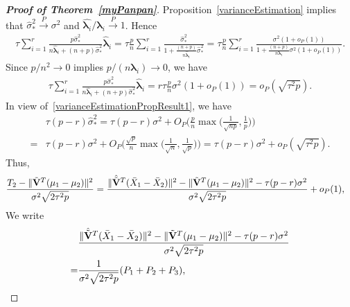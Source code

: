 \documentclass[3p]{elsarticle}
\newcommand{\bfsym}[1]{\ensuremath{\boldsymbol{#1}}}
\def\blambda {\bfsym {\lambda}}        \def\bLambda {\bfsym {\Lambda}}
\theoremstyle{plain}
\theoremstyle{definition}
\theoremstyle{remark}
\begin{document}
\begin{appendices}
\begin{proof}[\textbf{Proof of Theorem~\ref{myPanpan}}]
    Proposition~\ref{varianceEstimation} implies that $\hat{\sigma}_{*}^2\xrightarrow{P} \sigma^2$ and $\hat{\blambda_i}/\blambda_i\xrightarrow{P} 1$.
    Hence
    $$
    \begin{aligned} 
 \tau\sum_{i=1}^r \frac{p\hat{\sigma}_*^2}{n\hat{\blambda}_i+(n+p)\hat{\sigma}_*^2}\hat{\blambda}_i
        =
        \tau\frac{p}{n}\sum_{i=1}^r \frac{\hat{\sigma}_*^2}{1+\frac{(n+p)}{n\hat{\blambda}_i}\hat{\sigma}_*^2}
        =
        \tau\frac{p}{n}\sum_{i=1}^r \frac{\sigma^2(1+o_P(1))}{1+\frac{(n+p)}{n\blambda_i}\sigma^2(1+o_P(1))}.
    \end{aligned}
    $$
    Since $p/n^2\to 0$ implies $p/(n\blambda_i)\to 0$, we have
    $$
    \begin{aligned} 
 \tau\sum_{i=1}^r \frac{p\hat{\sigma}_*^2}{n\hat{\blambda}_i+(n+p)\hat{\sigma}_*^2}\hat{\blambda}_i
        =r\tau \frac{p}{n} \sigma^2(1+o_P(1))=o_P(\sqrt{\tau^2 p}).
    \end{aligned}
    $$
    In view of~\eqref{varianceEstimationPropResult1}, we have
    $$
    \begin{aligned}
        &\tau(p-r)\hat{\sigma}_*^2 =
    \tau(p-r)\sigma^2 + O_P\Big(\frac{p}{n}\max\big(\frac{1}{\sqrt{np}},\frac{1}{p}\big)\Big)\\
        =&
        \tau(p-r)\sigma^2 + O_P\Big(\frac{\sqrt{p}}{n}\max\big(\frac{1}{\sqrt{n}},\frac{1}{\sqrt{p}}\big)\Big)
        =\tau(p-r)\sigma^2 + o_P(\sqrt{\tau^2 p}).
    \end{aligned}
    $$
Thus,
\begin{equation*}
    \begin{aligned}
        &\frac{T_2-\|\tilde{\mathbf{V}}^T(\mu_1-\mu_2)\|^2}{\sigma^2\sqrt{2\tau^2 p}}
        =
        \frac{\|\hat{\tilde{\mathbf{V}}}^T(\bar{X}_1-\bar{X}_2)\|^2-\|\tilde{\mathbf{V}}^T(\mu_1-\mu_2)\|^2
        -\tau (p-r)\sigma^2
        }{\sigma^2\sqrt{2\tau^2 p}}+o_P(1),
    \end{aligned}
\end{equation*}
    We write
\begin{equation*}
    \begin{aligned}
        &\frac{\|\hat{\tilde{\BV}}^T(\bar{X}_1-\bar{X}_2)\|^2-\|\tilde{\BV}^T(\mu_1-\mu_2)\|^2
        -\tau (p-r)\sigma^2
        }{\sigma^2\sqrt{2\tau^2 p}}
        \\
        =&\frac{1}{\sigma^2\sqrt{2\tau^2 p}}(
        P_1+P_2+P_3
        ),
    \end{aligned}

\end{equation*}
\end{proof}
\end{appendices}
\end{document}
